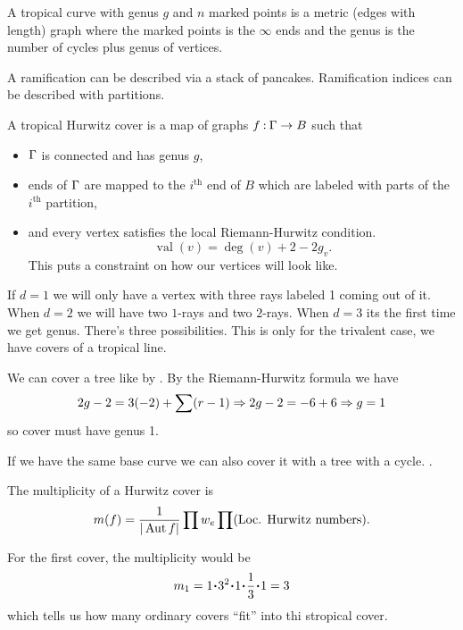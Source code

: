 \documentclass[12pt]{memoir}
\DeclareMathOperator{\val}{val}
\begin{document}
\begin{Def}
    A tropical curve with genus $g$ and $n$ marked points is a metric (edges with length) graph where the marked points is the $\infty$ ends and the genus is the number of cycles plus genus of vertices.\par 
    A ramification can be described via a stack of pancakes. Ramification indices can be described with partitions.\par 
    A tropical Hurwitz cover is a map of graphs $f\mathbin{:}\Gamma\to B$ such that 
    \begin{itemize}
        \item $\Gamma$ is connected and has genus $g$,
        \item ends of $\Gamma$ are mapped to the $i^{\text{th}}$ end of $B$ which are labeled with parts of the $i^{\text{th}}$ partition,
        \item and every vertex satisfies the local Riemann-Hurwitz condition.
        $$\val(v)=\deg(v)+2-2g_v.$$
        This puts a constraint on how our vertices will look like. 
    \end{itemize}
\end{Def}

\begin{Ex}
    If $d=1$ we will only have a vertex with three rays labeled 1 coming out of it. When $d=2$ we will have two $1$-rays and two $2$-rays. When $d=3$ its the first time we get genus. There's three possibilities. This is only for the trivalent case, we have covers of a tropical line.
\end{Ex}

\begin{Ex}
    We can cover a tree like  by . By the Riemann-Hurwitz formula we have 
    $$2g-2=3(-2)+\sum(r-1)\Rightarrow 2g-2=-6+6\Rightarrow g=1$$
    so cover must have genus 1.\par
    If we have the same base curve we can also cover it with a tree with a cycle. .
\end{Ex}

\begin{Def}
    The multiplicity of a Hurwitz cover is 
    $$m(f)=\frac{1}{|\operatorname{Aut} f|}\prod w_e\prod (\text{Loc. Hurwitz numbers}).$$
\end{Def}

For the first cover, the multiplicity would be 
$$m_1=1\.3^2\.1\.\frac13\.1=3$$
which tells us how many ordinary covers ``fit'' into thi stropical cover.
\end{document}
